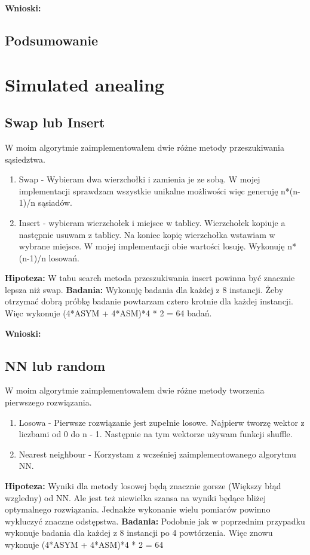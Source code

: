 \documentclass{article}
\begin{document}
        \FloatBarrier
        \textbf{Wnioski: } 

      \subsection{Podsumowanie}
    \section{Simulated anealing}
      \subsection{Swap lub Insert}
        W moim algorytmie zaimplementowałem dwie różne metody przeszukiwania sąsiedztwa.
        \begin{enumerate}
          \item Swap - Wybieram dwa wierzchołki i zamienia je ze sobą. W mojej implementacji
          sprawdzam wszystkie unikalne możliwości więc generuję n*(n-1)/n sąsiadów.
          \item Insert - wybieram wierzchołek i miejsce w tablicy. Wierzchołek kopiuje a następnie 
          usuwam z tablicy. Na koniec kopię wierzchołka wstawiam w wybrane miejsce. W mojej 
          implementacji obie wartości losuję. Wykonuję n*(n-1)/n losowań.
        \end{enumerate}
        \textbf{Hipoteza: } W tabu search metoda przeszukiwania insert powinna być znacznie lepsza
        niż swap.
        \textbf{Badania: } Wykonuję badania dla każdej z 8 instancji. Żeby otrzymać dobrą próbkę 
        badanie powtarzam cztero krotnie dla każdej instancji. Więc wykonuje (4*ASYM + 4*ASM)*4 * 2 = 64
        badań. 

        \textbf{Wnioski: } 
      \subsection{NN lub random}
        W moim algorytmie zaimplementowałem dwie różne metody tworzenia pierwszego rozwiązania.
        \begin{enumerate}
          \item Losowa - Pierwsze rozwiązanie jest zupełnie losowe. Najpierw tworzę wektor z liczbami
          od 0 do n - 1. Następnie na tym wektorze używam funkcji shuffle. 
          \item Nearest neighbour - Korzystam z wcześniej zaimplementowanego algorytmu NN. 
        \end{enumerate}
        \textbf{Hipoteza: } Wyniki dla metody losowej będą znacznie gorsze (Większy błąd wzgledny) od NN.
        Ale jest też niewielka szansa na wyniki będące bliżej optymalnego rozwiązania. Jednakże wykonanie
        wielu pomiarów powinno wykluczyć znaczne odstępstwa.\linebreak
        \textbf{Badania: } Podobnie jak w poprzednim przypadku wykonuje badania dla każdej z 8 instancji
        po 4 powtórzenia. Więc znowu wykonuje (4*ASYM + 4*ASM)*4 * 2 = 64\linebreak
\end{document}
